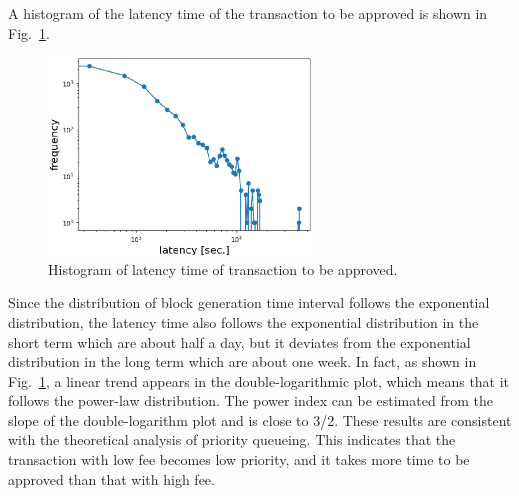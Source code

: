 \documentclass[graybox]{svmult}
\begin{document}
A histogram of the latency time of the transaction to be approved is shown in Fig.~\ref{fig:exp3-2}.
%
\begin{figure}[t]
  \begin{center}
    \includegraphics[width=70mm]{exp3-2.eps}
  \end{center}
  \caption{Histogram of latency time of transaction to be approved.}
  \label{fig:exp3-2}
\end{figure}
%
Since the distribution of block generation time interval follows the exponential distribution, the latency time also follows the exponential distribution in the short term which are about half a day, but it deviates from the exponential distribution in the long term which are about one week.
In fact, as shown in Fig.~\ref{fig:exp3-2}, a linear trend appears in the double-logarithmic plot, which means that it follows the power-law distribution.
The power index can be estimated from the slope of the double-logarithm plot and is close to 3/2.
These results are consistent with the theoretical analysis of priority queueing.
This indicates that the transaction with low fee becomes low priority, and it takes more time to be approved than that with high fee. 
\end{document}
